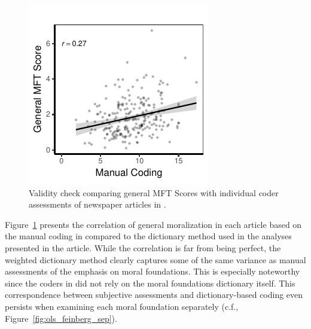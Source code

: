 \documentclass[12pt]{article}
\begin{document}
\begin{figure}[ht]\centering
\includegraphics{../calc/fig/feinberg_general.pdf}
\caption{Validity check comparing general MFT Scores with individual coder assessments of newspaper articles in \citet{feinberg2013moral}.}\label{fig:ols_feinberg}
\end{figure}

Figure~\ref{fig:ols_feinberg} presents the correlation of general moralization in each article based on the manual coding in \citet{feinberg2013moral} compared to the dictionary method used in the analyses presented in the article. While the correlation is far from being perfect, the weighted dictionary method clearly captures some of the same variance as manual assessments of the emphasis on moral foundations. This is especially noteworthy since the coders in \citet{feinberg2013moral} did not rely on the moral foundations dictionary itself. This correspondence between subjective assessments and dictionary-based coding even persists when examining each moral foundation separately (c.f., Figure~\ref{fig:ols_feinberg_sep}).
\end{document}
